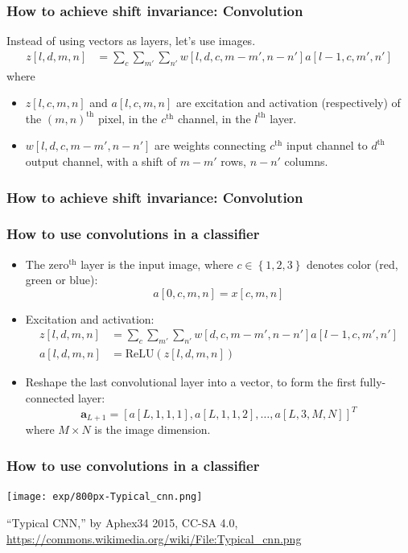 \documentclass{beamer}
\begin{document}
\begin{frame}
  \frametitle{How to achieve shift invariance: Convolution}

  Instead of using vectors as layers, let's use images.
  \begin{align*}
    z[l,d,m,n] &= \sum_c\sum_{m'}\sum_{n'} w[l,d,c,m-m',n-n']a[l-1,c,m',n']
  \end{align*}
  where
  \begin{itemize}
  \item $z[l,c,m,n]$ and $a[l,c,m,n]$ are excitation and
    activation (respectively) of the $(m,n)^{\textrm{th}}$ pixel, in
    the $c^{\textrm{th}}$ channel, in the $l^{\textrm{th}}$ layer.
  \item $w[l,d,c,m-m',n-n']$ are weights connecting $c^{\textrm{th}}$
    input channel to $d^{\textrm{th}}$ output channel, with a shift of
    $m-m'$ rows, $n-n'$ columns.
  \end{itemize}
\end{frame}

\begin{frame}
  \frametitle{How to achieve shift invariance: Convolution}

  \centerline{}
\end{frame}

\begin{frame}
  \frametitle{How to use convolutions in a classifier}
  \begin{itemize}
  \item The zero$^{\textrm{th}}$ layer is the input image, where
    $c\in\left\{1,2,3\right\}$ denotes color (red, green or blue):
    \[
    a[0,c,m,n] = x[c,m,n]
    \]
  \item Excitation and activation:
    \begin{align*}
      z[l,d,m,n] &= \sum_c\sum_{m'}\sum_{n'} w[d,c,m-m',n-n']a[l-1,c,m',n']\\
      a[l,d,m,n] &= \mbox{ReLU}\left(z[l,d,m,n]\right)
    \end{align*}
  \item Reshape the last convolutional layer into a vector, to form
    the first fully-connected layer:
    \[
    \mathbf{a}_{L+1}=[a[L,1,1,1], a[L,1,1,2],\ldots, a[L,3,M,N]]^T
    \]
    where $M\times N$ is the image dimension.
  \end{itemize}
\end{frame}
      
\begin{frame}
  \frametitle{How to use convolutions in a classifier}

  \centerline{\texttt{[image: exp/800px-Typical\_cnn.png]}}
  \begin{tiny}
    ``Typical CNN,'' by Aphex34 2015, CC-SA 4.0,
    \url{https://commons.wikimedia.org/wiki/File:Typical_cnn.png}
  \end{tiny}
\end{frame}
\end{document}
